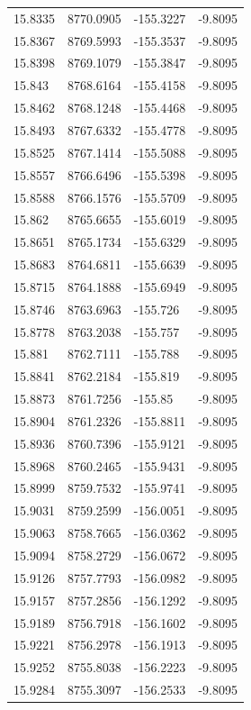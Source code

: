 \begin{table}[H]
\begin{tabular}{llll}
15.8335 & 8770.0905 & -155.3227 & -9.8095 \\
15.8367 & 8769.5993 & -155.3537 & -9.8095 \\
15.8398 & 8769.1079 & -155.3847 & -9.8095 \\
15.843 & 8768.6164 & -155.4158 & -9.8095 \\
15.8462 & 8768.1248 & -155.4468 & -9.8095 \\
15.8493 & 8767.6332 & -155.4778 & -9.8095 \\
15.8525 & 8767.1414 & -155.5088 & -9.8095 \\
15.8557 & 8766.6496 & -155.5398 & -9.8095 \\
15.8588 & 8766.1576 & -155.5709 & -9.8095 \\
15.862 & 8765.6655 & -155.6019 & -9.8095 \\
15.8651 & 8765.1734 & -155.6329 & -9.8095 \\
15.8683 & 8764.6811 & -155.6639 & -9.8095 \\
15.8715 & 8764.1888 & -155.6949 & -9.8095 \\
15.8746 & 8763.6963 & -155.726 & -9.8095 \\
15.8778 & 8763.2038 & -155.757 & -9.8095 \\
15.881 & 8762.7111 & -155.788 & -9.8095 \\
15.8841 & 8762.2184 & -155.819 & -9.8095 \\
15.8873 & 8761.7256 & -155.85 & -9.8095 \\
15.8904 & 8761.2326 & -155.8811 & -9.8095 \\
15.8936 & 8760.7396 & -155.9121 & -9.8095 \\
15.8968 & 8760.2465 & -155.9431 & -9.8095 \\
15.8999 & 8759.7532 & -155.9741 & -9.8095 \\
15.9031 & 8759.2599 & -156.0051 & -9.8095 \\
15.9063 & 8758.7665 & -156.0362 & -9.8095 \\
15.9094 & 8758.2729 & -156.0672 & -9.8095 \\
15.9126 & 8757.7793 & -156.0982 & -9.8095 \\
15.9157 & 8757.2856 & -156.1292 & -9.8095 \\
15.9189 & 8756.7918 & -156.1602 & -9.8095 \\
15.9221 & 8756.2978 & -156.1913 & -9.8095 \\
15.9252 & 8755.8038 & -156.2223 & -9.8095 \\
15.9284 & 8755.3097 & -156.2533 & -9.8095 \\

\end{tabular}
\end{table}
